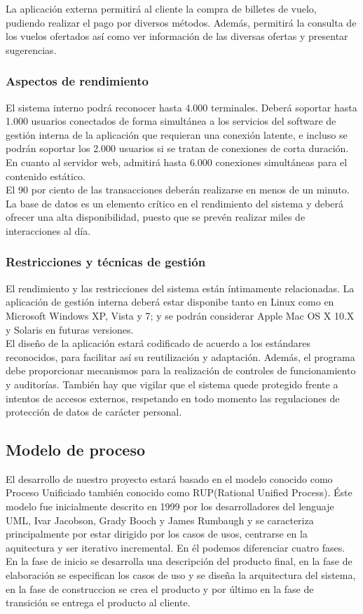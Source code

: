 \documentclass[11pt, a4paper, twoside]{report}
\begin{document}
			La aplicación externa permitirá al cliente la compra de billetes de vuelo, pudiendo realizar el pago por diversos métodos. Además, permitirá la consulta de los vuelos ofertados así como ver información de las diversas ofertas y presentar sugerencias.
			
			\subsubsection{Aspectos de rendimiento}
			El sistema interno podrá reconocer hasta 4.000 terminales. Deberá soportar hasta 1.000 usuarios conectados de forma simultánea a los servicios del software de gestión interna de la aplicación que requieran una conexión latente, e incluso se podrán soportar los 2.000 usuarios si se tratan de conexiones de corta duración.  En cuanto al servidor web, admitirá hasta 6.000 conexiones simultáneas para el contenido estático. \\
			El 90 por ciento de las transacciones deberán realizarse en menos de un minuto. La base de datos es un elemento crítico en el rendimiento del sistema y deberá ofrecer una alta disponibilidad, puesto que se prevén realizar miles de interacciones al día.

			\subsubsection{Restricciones y técnicas de gestión}
			El rendimiento y las restricciones del sistema están íntimamente relacionadas. La aplicación de gestión interna deberá estar disponibe tanto en Linux como en Microsoft Windows XP, Vista y 7; y se podrán considerar Apple Mac OS X 10.X y Solaris en futuras versiones.  \\
			El diseño de la aplicación estará codificado de acuerdo a los estándares reconocidos, para facilitar así su reutilización y adaptación. Además, el programa debe proporcionar mecanismos para la realización de controles de funcionamiento y auditorías. También hay que vigilar que el sistema quede protegido frente a intentos de accesos externos, respetando en todo momento las regulaciones de protección de datos de carácter personal.

		\subsection{Modelo de proceso}
		El desarrollo de nuestro proyecto estará basado en el modelo conocido como Proceso Unificiado también conocido como RUP(Rational Unified Process). Éste modelo fue inicialmente descrito en 1999 por los desarrolladores del lenguaje UML, Ivar Jacobson, Grady Booch y James Rumbaugh y se caracteriza principalmente por estar dirigido por los casos de usos, centrarse en la aquitectura y ser iterativo incremental. En él podemos diferenciar cuatro fases. En la fase de inicio se desarrolla una descripción del producto final, en la fase de elaboración se especifican los casos de uso y se diseña la arquitectura del sistema, en la fase de construccion se crea el producto y por último en la fase de transición se entrega el producto al cliente.
\end{document}
